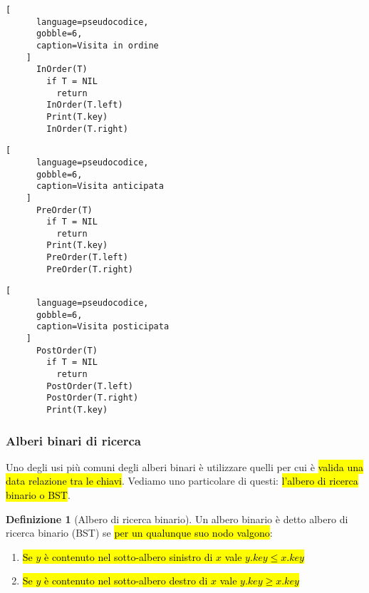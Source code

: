 \documentclass[a4paper,11pt,oneside]{article}
\theoremstyle{plain}
\theoremstyle{definition}
\newtheorem{defn}{Definizione}[section]
\theoremstyle{remark}
\begin{document}
\noindent\begin{minipage}{\textwidth}
  \centering
  \begin{minipage}{0.45\textwidth}
    \centering
    \begin{lstlisting}[
      language=pseudocodice,
      gobble=6,
      caption=Visita in ordine
    ]
      InOrder(T)
        if T = NIL
          return
        InOrder(T.left)
        Print(T.key)
        InOrder(T.right)
    \end{lstlisting}
  \end{minipage}
  \begin{minipage}{0.45\textwidth}
    \centering
    \begin{lstlisting}[
      language=pseudocodice,
      gobble=6,
      caption=Visita anticipata
    ]
      PreOrder(T)
        if T = NIL
          return
        Print(T.key)
        PreOrder(T.left)
        PreOrder(T.right)
    \end{lstlisting}
  \end{minipage}
  \begin{minipage}{0.45\textwidth}
    \centering
    \begin{lstlisting}[
      language=pseudocodice,
      gobble=6,
      caption=Visita posticipata
    ]
      PostOrder(T)
        if T = NIL
          return
        PostOrder(T.left)
        PostOrder(T.right)
        Print(T.key)
    \end{lstlisting}
  \end{minipage}
\end{minipage}

\subsubsection{Alberi binari di ricerca}\label{sec:bst}

Uno degli usi più comuni degli alberi binari è utilizzare quelli per cui è
\hl{valida una data relazione tra le chiavi}. Vediamo uno particolare di questi:
\hl{l'albero di ricerca binario o BST}.

\begin{defn}[Albero di ricerca binario]\label{def:bst}
  Un albero binario è detto albero di ricerca binario (BST) se \hl{per un
  qualunque suo nodo valgono}:

  \begin{enumerate}
    \item \hl{Se $y$ è contenuto nel sotto-albero sinistro di $x$ vale
      $y.key \leq x.key$}
    \item \hl{Se $y$ è contenuto nel sotto-albero destro di $x$ vale
      $y.key \geq x.key$}
  \end{enumerate}
\end{defn}
\end{document}
